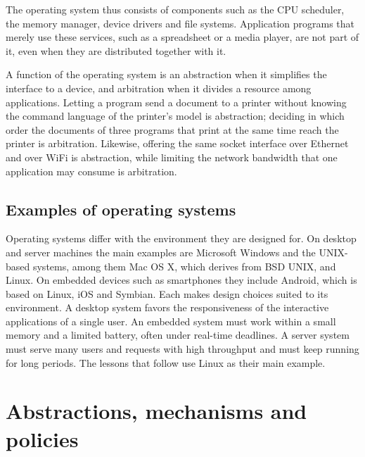 \documentclass[../main.tex]{subfiles}
\begin{document}
The operating system thus consists of components such as the CPU
scheduler, the memory manager, device drivers and file systems.  Application programs
that merely use these services, such as a spreadsheet or a media player,
are not part of it, even when they are distributed together with it.

\begin{example}
  A function of the operating system is an abstraction when it simplifies
  the interface to a device, and arbitration when it divides a resource
  among applications.  Letting a program send a document to a printer
  without knowing the command language of the printer's model is
  abstraction; deciding in which order the documents of three programs
  that print at the same time reach the printer is arbitration.  Likewise,
  offering the same socket interface over Ethernet and over WiFi is
  abstraction, while limiting the network bandwidth that one application
  may consume is arbitration.
\end{example}

\subsection{Examples of operating systems}

Operating systems differ with the environment they are designed
for.  On desktop and server
machines the main examples are Microsoft Windows and the UNIX-based
systems, among them Mac OS X, which derives from BSD UNIX, and Linux.  On
embedded devices such as smartphones they include Android, which is based
on Linux, iOS and Symbian.  Each makes design choices suited
to its environment.  A desktop system favors the responsiveness of the
interactive applications of a single user.  An embedded system must work
within a small memory and a limited battery, often under real-time
deadlines.  A server system must serve many users and requests with high
throughput and must keep running for long periods.  The lessons that
follow use Linux as their main example.

\section{Abstractions, mechanisms and policies}
\label{sec:l01-elements}
\end{document}
